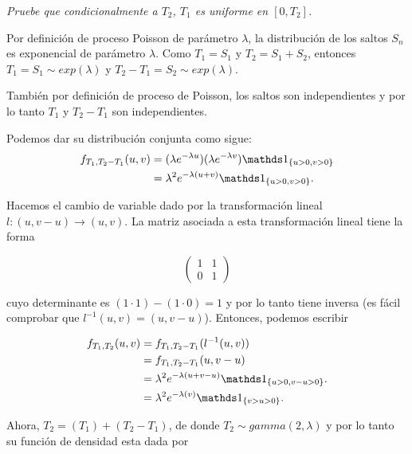 \emph{
	Pruebe que condicionalmente a $T_2$, $T_1$ es uniforme en $[0,T_2]$.
}

\afterstatement\pn

Por definición de proceso Poisson de parámetro $\lambda$, la distribución de los saltos $S_n$ es
exponencial de parámetro $\lambda$. Como $T_1 = S_1$ y $T_2 = S_1 + S_2$, entonces
$T_1  = S_1 \sim exp(\lambda) $ y  $T_2 - T_1 = S_2 \sim exp(\lambda)$.\pn

También por definición de proceso de Poisson, los saltos son independientes y por lo tanto
$T_1$ y $T_2 - T_1$ son independientes.\pn

Podemos dar su distribución conjunta como sigue:
\begin{align}
    f_{T_1, T_2 - T_1}(u, v)    &=  (\lambda e^{-\lambda u}) (\lambda e^{-\lambda v}) \indic_{\{ u > 0, v > 0 \}}   \\
                                &=  \lambda^2 e^{-\lambda (u + v)} \indic_{\{ u > 0, v > 0 \}}.
\end{align}

Hacemos el cambio de variable dado por la transformación lineal $l : (u, v-u) \longrightarrow (u, v)$.
La matriz asociada a esta transformación lineal tiene la forma

\[
    \left(
            \begin{array}{cc}
                    1   &   1   \\
                    0   &   1   \end{array}
    \right)
\]

cuyo determinante es $(1 \cdot 1) - (1 \cdot 0) = 1$ y por lo tanto tiene inversa (es fácil comprobar que $l^{-1}(u,v) = (u, v - u)$). 
Entonces, podemos escribir

\begin{align}
    f_{T_1, T_2}(u, v)      &=    f_{T_1, T_2 - T_1}(l^{-1}(u, v))                                      \\
                            &=    f_{T_1, T_2 - T_1}(u, v - u)                                          \\
                            &=    \lambda^2 e^{-\lambda (u + v - u)} \indic_{\{ u > 0, v - u > 0 \}}.     \\
                            &=    \lambda^2 e^{-\lambda (v)} \indic_{\{ v > u > 0 \}}.                    
\end{align}\pn

Ahora, $T_2 = (T_1) + (T_2 - T_1)$, de donde $T_2 \sim gamma(2, \lambda)$ y por lo tanto su función de densidad esta dada por

